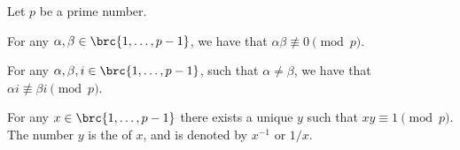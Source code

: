 \begin {lemma} Let $p$ be a prime number. \begin {compactenumA} \item For any $\alpha , \beta \in \brc { 1, \ldots , p-1}$, we have that $\alpha \beta \not \equiv 0 \pmod {p}$. \par \item For any $\alpha , \beta , i \in \brc { 1,\ldots , p-1}$, such that $\alpha \ne \beta $, we have that $\alpha i \nequiv \beta i \pmod {p}$. \par \par \item For any $x \in \brc {1,\ldots , p-1}$ there exists a unique $y$ such that $xy \equiv 1 \pmod {p}$. The number $y$ is the  of $x$, and is denoted by $x^{-1}$ or $1/x$. \end {compactenumA} \end {lemma}
